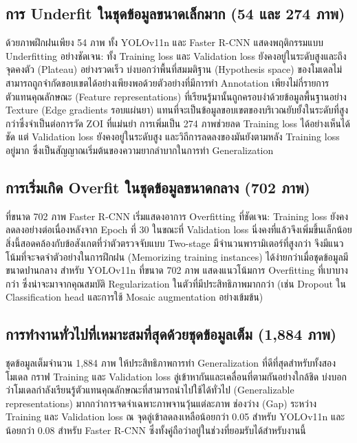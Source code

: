 \subsection{การ Underfit ในชุดข้อมูลขนาดเล็กมาก (54 และ 274 ภาพ)}

ด้วยภาพฝึกฝนเพียง 54 ภาพ ทั้ง YOLOv11n และ Faster R-CNN แสดงพฤติกรรมแบบ Underfitting อย่างชัดเจน:
ทั้ง Training loss และ Validation loss ยังคงอยู่ในระดับสูงและถึงจุดคงตัว (Plateau) อย่างรวดเร็ว
บ่งบอกว่าพื้นที่สมมติฐาน (Hypothesis space) ของโมเดลไม่สามารถถูกจำกัดขอบเขตได้อย่างเพียงพอด้วยตัวอย่างที่มีการทำ Annotation เพียงไม่กี่รายการ
ตัวแทนคุณลักษณะ (Feature representations) ที่เรียนรู้มานั้นถูกครอบงำด้วยข้อมูลพื้นฐานอย่าง Texture (Edge gradients รอบแผ่นยา) แทนที่จะเป็นข้อมูลขอบเขตของบริเวณยับยั้งในระดับที่สูงกว่าซึ่งจำเป็นต่อการวัด ZOI ที่แม่นยำ
การเพิ่มเป็น 274 ภาพช่วยลด Training loss ได้อย่างเห็นได้ชัด แต่ Validation loss ยังคงอยู่ในระดับสูง และวิถีการลดลงของมันยังตามหลัง Training loss อยู่มาก ซึ่งเป็นสัญญาณเริ่มต้นของความยากลำบากในการทำ Generalization

\subsection{การเริ่มเกิด Overfit ในชุดข้อมูลขนาดกลาง (702 ภาพ)}

ที่ขนาด 702 ภาพ Faster R-CNN เริ่มแสดงอาการ Overfitting ที่ชัดเจน:
Training loss ยังคงลดลงอย่างต่อเนื่องหลังจาก Epoch ที่ 30 ในขณะที่ Validation loss นิ่งคงที่แล้วจึงเพิ่มขึ้นเล็กน้อย
สิ่งนี้สอดคล้องกับข้อสังเกตที่ว่าตัวตรวจจับแบบ Two-stage มีจำนวนพารามิเตอร์ที่สูงกว่า จึงมีแนวโน้มที่จะจดจำตัวอย่างในการฝึกฝน (Memorizing training instances) ได้ง่ายกว่าเมื่อชุดข้อมูลมีขนาดปานกลาง
สำหรับ YOLOv11n ที่ขนาด 702 ภาพ แสดงแนวโน้มการ Overfitting ที่เบาบางกว่า ซึ่งน่าจะมาจากคุณสมบัติ Regularization ในตัวที่มีประสิทธิภาพมากกว่า (เช่น Dropout ใน Classification head และการใช้ Mosaic augmentation อย่างเข้มข้น)

\subsection{การทำงานทั่วไปที่เหมาะสมที่สุดด้วยชุดข้อมูลเต็ม (1,884 ภาพ)}

ชุดข้อมูลเต็มจำนวน 1,884 ภาพ ให้ประสิทธิภาพการทำ Generalization ที่ดีที่สุดสำหรับทั้งสองโมเดล
กราฟ Training และ Validation loss ลู่เข้าหากันและเคลื่อนที่ตามกันอย่างใกล้ชิด บ่งบอกว่าโมเดลกำลังเรียนรู้ตัวแทนคุณลักษณะที่สามารถนำไปใช้ได้ทั่วไป (Generalizable representations) มากกว่าการจดจำเฉพาะภาพจานวุ้นแต่ละภาพ
ช่องว่าง (Gap) ระหว่าง Training และ Validation loss ณ จุดลู่เข้าลดลงเหลือน้อยกว่า 0.05 สำหรับ YOLOv11n และน้อยกว่า 0.08 สำหรับ Faster R-CNN ซึ่งทั้งคู่ถือว่าอยู่ในช่วงที่ยอมรับได้สำหรับงานนี้

